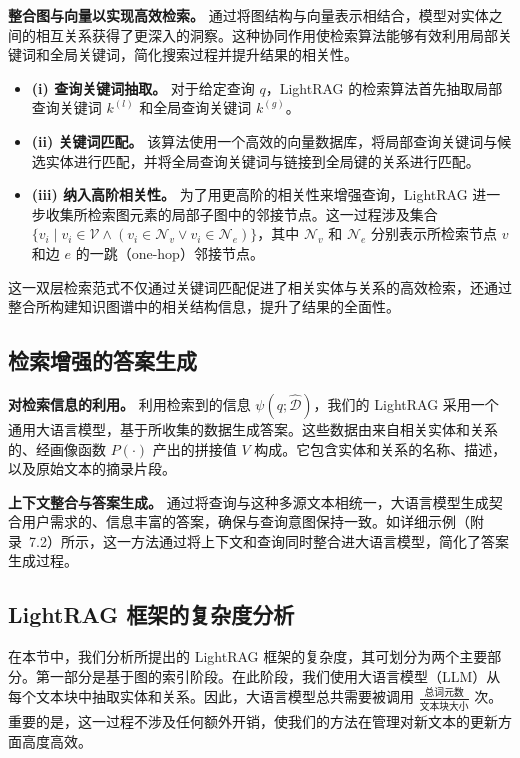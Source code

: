 \documentclass[11pt,UTF8,fontset=fandol]{ctexart}
\begin{document}
\textbf{整合图与向量以实现高效检索。} 通过将图结构与向量表示相结合，模型对实体之间的相互关系获得了更深入的洞察。这种协同作用使检索算法能够有效利用局部关键词和全局关键词，简化搜索过程并提升结果的相关性。
\begin{itemize}[leftmargin=1.5em]
\item \textbf{(i) 查询关键词抽取。} 对于给定查询 $q$，LightRAG 的检索算法首先抽取局部查询关键词 $k^{(l)}$ 和全局查询关键词 $k^{(g)}$。
\item \textbf{(ii) 关键词匹配。} 该算法使用一个高效的向量数据库，将局部查询关键词与候选实体进行匹配，并将全局查询关键词与链接到全局键的关系进行匹配。
\item \textbf{(iii) 纳入高阶相关性。} 为了用更高阶的相关性来增强查询，LightRAG 进一步收集所检索图元素的局部子图中的邻接节点。这一过程涉及集合 $\{v_i \mid v_i \in \mathcal{V} \wedge (v_i \in \mathcal{N}_v \vee v_i \in \mathcal{N}_e)\}$，其中 $\mathcal{N}_v$ 和 $\mathcal{N}_e$ 分别表示所检索节点 $v$ 和边 $e$ 的一跳（one-hop）邻接节点。
\end{itemize}

这一双层检索范式不仅通过关键词匹配促进了相关实体与关系的高效检索，还通过整合所构建知识图谱中的相关结构信息，提升了结果的全面性。

\subsection{检索增强的答案生成}

\textbf{对检索信息的利用。} 利用检索到的信息 $\psi(q; \hat{\mathcal{D}})$，我们的 LightRAG 采用一个通用大语言模型，基于所收集的数据生成答案。这些数据由来自相关实体和关系的、经画像函数 $P(\cdot)$ 产出的拼接值 $V$ 构成。它包含实体和关系的名称、描述，以及原始文本的摘录片段。

\textbf{上下文整合与答案生成。} 通过将查询与这种多源文本相统一，大语言模型生成契合用户需求的、信息丰富的答案，确保与查询意图保持一致。如详细示例（附录~7.2）所示，这一方法通过将上下文和查询同时整合进大语言模型，简化了答案生成过程。

\subsection{LightRAG 框架的复杂度分析}

在本节中，我们分析所提出的 LightRAG 框架的复杂度，其可划分为两个主要部分。第一部分是基于图的索引阶段。在此阶段，我们使用大语言模型（LLM）从每个文本块中抽取实体和关系。因此，大语言模型总共需要被调用 $\frac{\text{总词元数}}{\text{文本块大小}}$ 次。重要的是，这一过程不涉及任何额外开销，使我们的方法在管理对新文本的更新方面高度高效。
\end{document}

